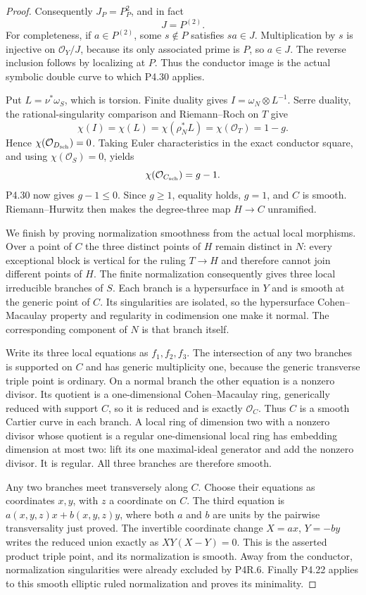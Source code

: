 \begin{proof}
Consequently $J_P=P_P^2$, and in fact
\[
 J=P^{(2)}.
\]
For completeness, if $a\in P^{(2)}$, some $s\notin P$
satisfies $sa\in J$. Multiplication by $s$ is injective
on $\mathcal O_Y/J$, because its only associated prime
is $P$, so $a\in J$. The reverse inclusion follows by
localizing at $P$. Thus the conductor image is the
actual symbolic double curve to which P4.30 applies.

Put $L=\nu^*\omega_S$, which is torsion. Finite duality
gives $I=\omega_N\otimes L^{-1}$. Serre duality, the
rational-singularity comparison and Riemann--Roch on
$T$ give
\[
 \chi(I)=\chi(L)=\chi(\rho_N^*L)
   =\chi(\mathcal O_T)=1-g.
\]
Hence $\chi(\mathcal O_{D_{\rm sch}})=0$.
Taking Euler characteristics in the exact conductor
square, and using $\chi(\mathcal O_S)=0$, yields
\[
 \chi(\mathcal O_{C_{\rm sch}})=g-1.
\]
P4.30 now gives $g-1\le0$. Since $g\ge1$, equality
holds, $g=1$, and $C$ is smooth. Riemann--Hurwitz then
makes the degree-three map $H\to C$ unramified.

We finish by proving normalization smoothness from
the actual local morphisms. Over a point of $C$ the
three distinct points of $H$ remain distinct in $N$:
every exceptional block is vertical for the ruling
$T\to H$ and therefore cannot join different points
of $H$. The finite normalization consequently gives
three local irreducible branches of $S$. Each branch
is a hypersurface in $Y$ and is smooth at the generic
point of $C$. Its singularities are isolated, so the
hypersurface Cohen--Macaulay property and regularity
in codimension one make it normal. The corresponding
component of $N$ is that branch itself.

Write its three local equations as $f_1,f_2,f_3$.
The intersection of any two branches is supported on
$C$ and has generic multiplicity one, because the
generic transverse triple point is ordinary. On a
normal branch the other equation is a nonzero divisor.
Its quotient is a one-dimensional Cohen--Macaulay
ring, generically reduced with support $C$, so it is
reduced and is exactly $\mathcal O_C$. Thus $C$ is a
smooth Cartier curve in each branch. A local ring of
dimension two with a nonzero divisor whose quotient
is a regular one-dimensional local ring has embedding
dimension at most two: lift its one maximal-ideal
generator and add the nonzero divisor. It is regular.
All three branches are therefore smooth.

Any two branches meet transversely along $C$.
Choose their equations as coordinates $x,y$, with
$z$ a coordinate on $C$. The third equation is
$a(x,y,z)x+b(x,y,z)y$, where both $a$ and $b$ are
units by the pairwise transversality just proved.
The invertible coordinate change $X=ax$, $Y=-by$
writes the reduced union exactly as
$XY(X-Y)=0$. This is the asserted product triple
point, and its normalization is smooth. Away from
the conductor, normalization singularities were
already excluded by P4R.6. Finally P4.22 applies to
this smooth elliptic ruled normalization and proves
its minimality.
\end{proof}
